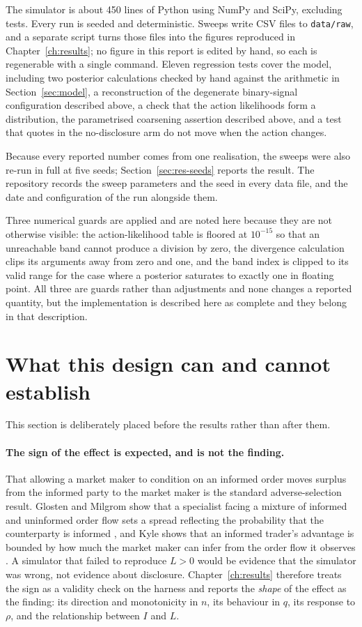The simulator is about 450 lines of Python using NumPy and SciPy, excluding tests. Every run is
seeded and deterministic. Sweeps write CSV files to \texttt{data/raw}, and a separate script
turns those files into the figures reproduced in Chapter~\ref{ch:results}; no figure in this
report is edited by hand, so each is regenerable with a single command. Eleven regression tests
cover the model, including two posterior calculations checked by hand against the arithmetic
in Section~\ref{sec:model}, a reconstruction of the degenerate binary-signal configuration
described above, a check that the action likelihoods form a distribution, the
parametrised coarsening assertion described above, and a test that quotes in the
no-disclosure arm do not move when the action changes.

Because every reported number comes from one realisation, the sweeps were also re-run in
full at five seeds; Section~\ref{sec:res-seeds} reports the result. The repository records the sweep parameters and the
seed in every data file, and the date and configuration of the run alongside them.

Three numerical guards are applied and are noted here because they are not otherwise
visible: the action-likelihood table is floored at $10^{-15}$ so that an unreachable band
cannot produce a division by zero, the divergence calculation clips its arguments away from
zero and one, and the band index is clipped to its valid range for the case where a
posterior saturates to exactly one in floating point. All three are guards rather than
adjustments and none changes a reported quantity, but the implementation is described here
as complete and they belong in that description.

\section{What this design can and cannot establish}
\label{sec:cannot}

This section is deliberately placed before the results rather than after them.

\paragraph{The sign of the effect is expected, and is not the finding.} That allowing a
market maker to condition on an informed order moves surplus from the informed party to the
market maker is the standard adverse-selection result. Glosten and Milgrom show that a
specialist facing a mixture of informed and uninformed order flow sets a spread reflecting
the probability that the counterparty is informed \cite{glosten1985bidask}, and Kyle shows
that an informed trader's advantage is bounded by how much the market maker can infer from
the order flow it observes \cite{kyle1985continuous}. A simulator that failed to reproduce
$L > 0$ would be evidence that the simulator was wrong, not evidence about disclosure.
Chapter~\ref{ch:results} therefore treats the sign as a validity check on the harness and
reports the \emph{shape} of the effect as the finding: its direction and monotonicity in
$n$, its behaviour in $q$, its response to $\rho$, and the relationship between $I$ and $L$.

